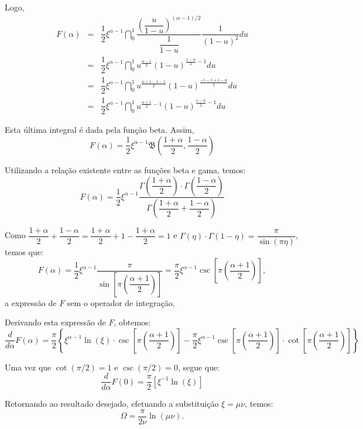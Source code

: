 {Logo,
$$\begin{array}{rcl}
F(\alpha)
&=&
\dfrac{1}{2} \xi^{\alpha-1} \dint_{0}^{1} \dfrac{\left(\dfrac{u}{1-u}\right)^{(\alpha-1)/2}}{\dfrac{1}{1-u}} \dfrac{1}{(1-u)^2} du \\
&=&
\dfrac{1}{2} \xi^{\alpha-1} \dint_{0}^{1} u^{\frac{\alpha-1}{2}} (1-u)^{\frac{1-\alpha}{2}-1} du \\
&=&
\dfrac{1}{2} \xi^{\alpha-1} \dint_{0}^{1} u^{\frac{\alpha+1-1-1}{2}} (1-u)^{\frac{-1-1+1-\alpha}{2}} du \\
&=&
\dfrac{1}{2} \xi^{\alpha-1} \dint_{0}^{1} u^{\frac{\alpha+1}{2}-1} (1-u)^{\frac{1-\alpha}{2}-1} du
\end{array}$$

Esta última integral é dada pela função beta. Assim,
$$
F(\alpha)
= \dfrac{1}{2} \xi^{\alpha-1} \mathfrak{B}\left(\dfrac{1+\alpha}{2}, \dfrac{1-\alpha}{2}\right)
$$

Utilizando a relação existente entre as funções beta e gama, temos:
$$
F(\alpha)
= \dfrac{1}{2} \xi^{\alpha-1} 
\dfrac{
\Gamma\left(\dfrac{1+\alpha}{2}\right) \cdot
\Gamma\left(\dfrac{1-\alpha}{2}\right)
}
{
\Gamma\left(\dfrac{1+\alpha}{2}+\dfrac{1-\alpha}{2}\right)
}
$$

Como
$\dfrac{1+\alpha}{2}+\dfrac{1-\alpha}{2} = \dfrac{1+\alpha}{2}+1-\dfrac{1+\alpha}{2} = 1$ e $\Gamma(\eta) \cdot \Gamma(1-\eta) = \dfrac{\pi}{\sin(\pi\eta)}$, temos que:
$$
F(\alpha)
= \dfrac{1}{2} \xi^{\alpha-1} \dfrac{\pi}{\sin\left[\pi\left(\dfrac{\alpha+1}{2}\right)\right]}
= \dfrac{\pi}{2} \xi^{\alpha-1} \csc\left[\pi\left(\dfrac{\alpha+1}{2}\right)\right],
$$
a expressão de $F$ sem o operador de integração.

Derivando esta expressão de $F$, obtemos:
{\tiny
$$
\dfrac{d}{d\alpha}F(\alpha)
=
\dfrac{\pi}{2} \left\{
\xi^{\alpha-1} \ln(\xi) \cdot \csc\left[\pi\left(\dfrac{\alpha+1}{2}\right)\right] - \dfrac{\pi}{2} \xi^{\alpha-1} \csc\left[\pi\left(\dfrac{\alpha+1}{2}\right)\right] \cdot \cot\left[\pi\left(\dfrac{\alpha+1}{2}\right)\right]
\right\}
$$}

Uma vez que $\cot(\pi/2) = 1$ e $\csc(\pi/2) =0$, segue que:
$$
\dfrac{d}{d\alpha}F(0) = \dfrac{\pi}{2} [\xi^{-1}\ln(\xi)]
$$

Retornando ao resultado desejado, efetuando a substituição $\xi = \mu\nu$, temos:
$$\Omega = \dfrac{\pi}{2\nu} \ln(\mu\nu).$$
}




